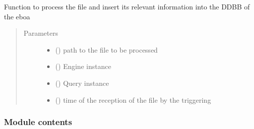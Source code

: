 \begin{fulllineitems}
\label{\detokenize{s2boa.ingestions:s2boa.ingestions.ingestion_station_schedule.ingestion_station_schedule.process_file}}
Function to process the file and insert its relevant information
into the DDBB of the eboa
\begin{quote}\begin{description}
\item[{Parameters}] \leavevmode\begin{itemize}
\item {} 
 () \textendash{} path to the file to be processed

\item {} 
 () \textendash{} Engine instance

\item {} 
 () \textendash{} Query instance

\item {} 
 () \textendash{} time of the reception of the file by the triggering

\end{itemize}

\end{description}\end{quote}

\end{fulllineitems}



\subsubsection{Module contents}
\label{\detokenize{s2boa.ingestions:module-s2boa.ingestions}}\label{\detokenize{s2boa.ingestions:module-contents}}

